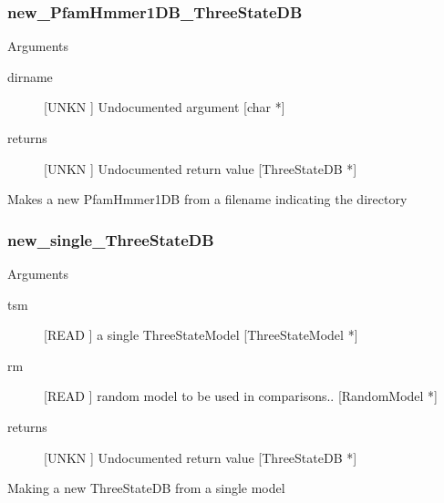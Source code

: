 \subsubsection{new_PfamHmmer1DB_ThreeStateDB}

Arguments
\begin{description}
\item[dirname] [UNKN ] Undocumented argument [char *]
\item[returns] [UNKN ] Undocumented return value [ThreeStateDB *]
\end{description}
Makes a new PfamHmmer1DB from a filename
indicating the directory


\subsubsection{new_single_ThreeStateDB}

Arguments
\begin{description}
\item[tsm] [READ ] a single ThreeStateModel [ThreeStateModel *]
\item[rm] [READ ] random model to be used in comparisons.. [RandomModel *]
\item[returns] [UNKN ] Undocumented return value [ThreeStateDB *]
\end{description}
Making a new ThreeStateDB from a single
model




